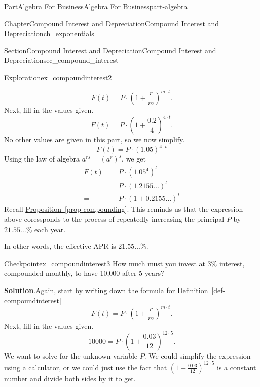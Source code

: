 \documentclass[oneside,10pt,]{tufte-book}
\newcommand{\blocktitlefont}{\relax}
\newcommand{\xreffont}{\relax}
\numberwithin{equation}{chapter}
\newcommand{\amp}{&}
\begin{document}
\begin{partptx}{Part}{Algebra For Business}{}{Algebra For Business}{}{}{part-algebra}
\begin{chapterptx}{Chapter}{Compound Interest and Depreciation}{}{Compound Interest and Depreciation}{}{}{ch_exponentials}
\begin{sectionptx}{Section}{Compound Interest and Depreciation}{}{Compound Interest and Depreciation}{}{}{sec_compound_interest}
\begin{exploration}{Exploration}{}{ex_compoundinterest2}
\begin{enumerate}[font=\bfseries,label=(\alph*),ref=\alph*]
\begin{equation*}
F(t) = P \cdot \left(1 + \frac{r}{m}\right)^{m\cdot t}\text{.}
\end{equation*}
Next, fill in the values given.%
\begin{equation*}
F(t) = P \cdot \left(1 + \frac{0.2}{4}\right)^{4\cdot t}\text{.}
\end{equation*}
No other values are given in this part, so we now simplify.%
\begin{equation*}
F(t) = P \cdot \left(1.05\right)^{4\cdot t}
\end{equation*}
Using the law of algebra \(a^{rs} = (a^r)^s\), we get%
\begin{align*}
F(t) = \amp P \cdot \left(1.05^4\right)^{t}\\
= \amp P \cdot \left(1.2155\dots \right)^{t} \\
= \amp P \cdot \left(1 + 0.2155\dots \right)^{t} 
\end{align*}
Recall \hyperref[prop-compounding]{Proposition~{\xreffont\ref{prop-compounding}}}.  This reminds us that the expression above coressponds to the process of repeatedly increasing the principal \(P\) by \(21.55\dots\)\% each year.%
\par
In other words, the effective APR is \(21.55\dots\)\%.%
\end{enumerate}%
\end{exploration}%
\begin{inlineexercise}{Checkpoint}{}{ex_compoundinterest3}%
How much must you invest at 3\% interest, compounded monthly, to have 10,000 after 5 years?%
\par\smallskip%
\noindent\textbf{\blocktitlefont Solution}.\hypertarget{ex_compoundinterest3-2}{}\quad{}Again, start by writing down the formula for  \hyperref[def-compoundinterest]{Definition~{\xreffont\ref{def-compoundinterest}}}%
\begin{equation*}
F(t) = P \cdot \left(1 + \frac{r}{m}\right)^{m\cdot t}\text{.}
\end{equation*}
Next, fill in the values given.%
\begin{equation*}
10000 = P \cdot \left(1 + \frac{0.03}{12}\right)^{12\cdot 5}\text{.}
\end{equation*}
We want to solve for the unknown variable \(P\).  We could simplify the expression using a calculator, or we could just use the fact that \(\left(1 + \frac{0.03}{12}\right)^{12\cdot 5}\) is a constant number and divide both sides by it to get.%
\begin{equation*}

\end{equation*}
\end{inlineexercise}
\end{sectionptx}
\end{chapterptx}
\end{partptx}
\end{document}

